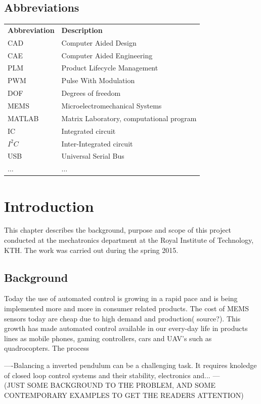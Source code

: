 \documentclass[a4paper,11pt]{kth-mag}
\begin{document}
\section*{Abbreviations}
\noindent{}\begin{tabular}{@{}p{2.5cm}l}
\textbf{Abbreviation} 	& \textbf{Description} \vspace{.5em} \\
CAD			& Computer Aided Design \\
CAE			& Computer Aided Engineering\\
PLM			& Product Lifecycle Management\\
PWM			& Pulse With Modulation\\
DOF			& Degrees of freedom\\
MEMS			& Microelectromechanical Systems \\
MATLAB		& Matrix Laboratory, computational program\\
IC			& Integrated circuit\\
$I^2C$		& Inter-Integrated circuit\\
USB			& Universal Serial Bus \\
$\ldots$		& $\ldots$ 
\end{tabular}
\cleardoublepage

\mainmatter
\pagestyle{newchap}

\chapter{Introduction}
This chapter describes the background, purpose and scope of this project conducted at the mechatronics department at the Royal Institute of Technology, KTH. The work was carried out during the spring 2015.
\section{Background}
Today the use of automated control is growing in a rapid pace and is being implemented more and more in consumer related products. The cost of MEMS sensors today are cheap due to high demand and production( source?). This growth has made automated control available in our every-day life in products lines as mobile phones, gaming controllers, cars and UAV's such as quadrocopters. The process 

----Balancing a inverted pendulum can be a challenging task. It requires knoledge of closed loop control systems and their stability, electronics and... ---
\\ (JUST SOME BACKGROUND TO THE PROBLEM, AND SOME CONTEMPORARY EXAMPLES TO GET THE READERS ATTENTION)
\end{document}
